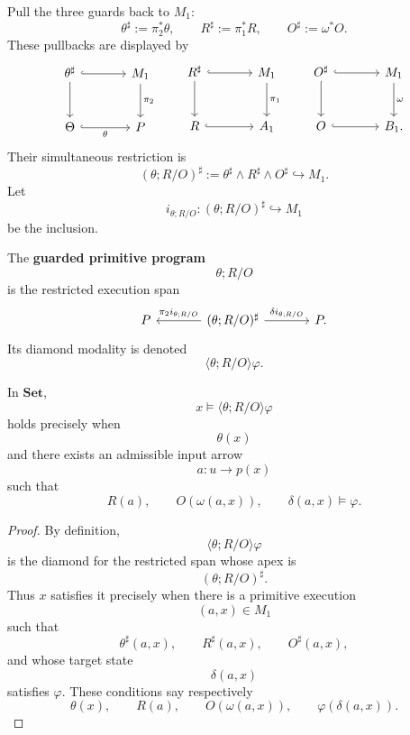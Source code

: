 Pull the three guards back to \(M_1\):
\[
\theta^\sharp:=\pi_2^\ast\theta,
\qquad
R^\sharp:=\pi_1^\ast R,
\qquad
O^\sharp:=\omega^\ast O.
\]
These pullbacks are displayed by
\[
\begin{tikzcd}[column sep=large,row sep=large]
\theta^\sharp
  \arrow[r, hook]
  \arrow[d]
&
M_1
  \arrow[d, "\pi_2"]
\\
\Theta
  \arrow[r, hook, "\theta"']
&
P
\end{tikzcd}
\qquad
\begin{tikzcd}[column sep=large,row sep=large]
R^\sharp
  \arrow[r, hook]
  \arrow[d]
&
M_1
  \arrow[d, "\pi_1"]
\\
R
  \arrow[r, hook]
&
A_1
\end{tikzcd}
\qquad
\begin{tikzcd}[column sep=large,row sep=large]
O^\sharp
  \arrow[r, hook]
  \arrow[d]
&
M_1
  \arrow[d, "\omega"]
\\
O
  \arrow[r, hook]
&
B_1 .
\end{tikzcd}
\]
Their simultaneous restriction is
\[
(\theta;R/O)^\sharp
:=
\theta^\sharp\wedge R^\sharp\wedge O^\sharp
\hookrightarrow M_1.
\]
Let
\[
i_{\theta;R/O}:(\theta;R/O)^\sharp\hookrightarrow M_1
\]
be the inclusion.

\begin{definition}
\label{def:guarded-primitive-mealy-program}
The \textbf{guarded primitive program}
\[
\theta;R/O
\]
is the restricted execution span
\[
\begin{tikzcd}[column sep=large]
P
&
(\theta;R/O)^\sharp
  \arrow[l, "\pi_2 i_{\theta;R/O}"']
  \arrow[r, "\delta i_{\theta;R/O}"]
&
P .
\end{tikzcd}
\]
Its diamond modality is denoted
\[
\langle \theta;R/O\rangle\varphi.
\]
\end{definition}

\begin{proposition}
\label{prop:external-reading-guarded-primitive}
In \(\mathbf{Set}\),
\[
x\models \langle \theta;R/O\rangle\varphi
\]
holds precisely when
\[
\theta(x)
\]
and there exists an admissible input arrow
\[
a:u\to p(x)
\]
such that
\[
R(a),
\qquad
O(\omega(a,x)),
\qquad
\delta(a,x)\models \varphi.
\]
\end{proposition}

\begin{proof}
By definition,
\[
\langle \theta;R/O\rangle\varphi
\]
is the diamond for the restricted span whose apex is
\[
(\theta;R/O)^\sharp.
\]
Thus \(x\) satisfies it precisely when there is a primitive execution
\[
(a,x)\in M_1
\]
such that
\[
\theta^\sharp(a,x),
\qquad
R^\sharp(a,x),
\qquad
O^\sharp(a,x),
\]
and whose target state
\[
\delta(a,x)
\]
satisfies \(\varphi\). These conditions say respectively
\[
\theta(x),
\qquad
R(a),
\qquad
O(\omega(a,x)),
\qquad
\varphi(\delta(a,x)).
\]
\end{proof}

